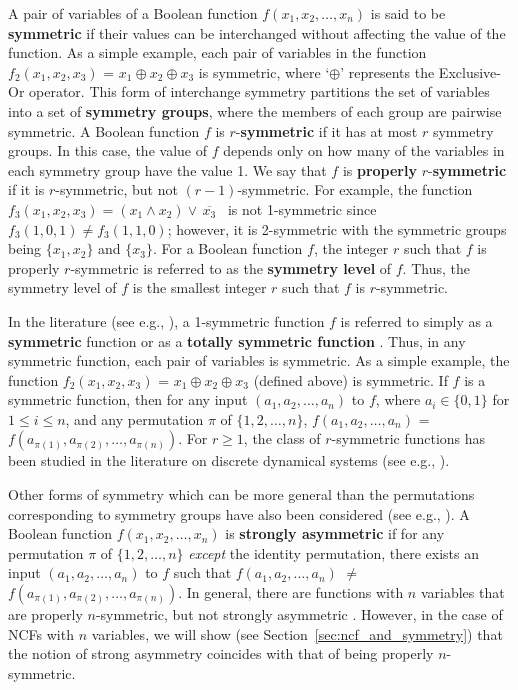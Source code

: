 A pair of variables of a Boolean function $f(x_1, x_2, \ldots, x_n)$ is
said to be \textbf{symmetric} if their values can be interchanged without
affecting the value of the function.
As a simple example, each pair of variables in the function 
$f_2(x_1, x_2, x_3)$ = $x_1 \oplus x_2 \oplus x_3$ is symmetric,
where `$\oplus$' represents the Exclusive-Or operator.
This form of interchange symmetry partitions the set of variables into a set of
\textbf{symmetry groups}, where the members of each group are pairwise symmetric.
A Boolean function $f$ is 
$r$-\textbf{symmetric} if it has at most $r$ symmetry groups.
In this case, the value of $f$
depends only on how many of the variables in each symmetry group have the value 1.
We say that $f$ is \textbf{properly} $r$-\textbf{symmetric} if
it is $r$-symmetric, but not $(r-1)$-symmetric.
For example, the function $f_3(x_1, x_2, x_3) = (x_1 \wedge x_2) \vee\, \overline{x_3}$~
is not 1-symmetric since $f_3(1, 0, 1) \neq f_3(1, 1, 0)$; however, 
it is 2-symmetric with the symmetric groups being $\{x_1, x_2\}$ and $\{x_3\}$.
For a Boolean function $f$, the integer $r$ such that $f$ is properly $r$-symmetric
is referred to as the \textbf{symmetry level} of $f$.
Thus, the symmetry level of $f$ is the smallest integer $r$ such that
$f$ is $r$-symmetric.

In the literature (see e.g., \cite{Crama-Hammer-2011,HT-2016,Toth-etal-1977}),
a 1-symmetric function $f$ is referred to simply
as a \textbf{symmetric} function or 
as a \textbf{totally symmetric function} \cite{Biswas-1970,BS-1968}.
Thus, in any symmetric function, each pair of variables is symmetric.
As a simple example, the function $f_2(x_1, x_2, x_3)$ = 
$x_1 \oplus x_2 \oplus x_3$ (defined above) is symmetric.
If $f$ is a symmetric function, then for any
input $(a_1, a_2, \ldots, a_n)$ to $f$, where $a_i \in \{0,1\}$ for
$1 \leq i \leq n$, and any permutation $\pi$ of $\{1, 2, \ldots, n\}$,
$f(a_1, a_2, \ldots, a_n)$ = $f(a_{\pi(1)}, a_{\pi(2)}, \ldots, a_{\pi(n)})$.
For $r \geq 1$, the class of $r$-symmetric functions has been
studied in the literature on discrete dynamical systems (see e.g., 
\cite{Barrett-etal-2007,Rosenkrantz-etal-2015,MR-2007}).

Other forms of symmetry which can be more general than the permutations 
corresponding to symmetry groups have also been considered (see e.g.,
\cite{Maurer-2015,KS-2000}).
A Boolean function $f(x_1, x_2, \ldots, x_n)$
is \textbf{strongly asymmetric}
if for any permutation $\pi$ of $\{1, 2, \ldots, n\}$
\emph{except} the identity permutation,
there exists an input $(a_1, a_2, \ldots,  a_n)$
to $f$ such that $f(a_1, a_2, \ldots, a_n)$ $\neq$
$f(a_{\pi(1)}, a_{\pi(2)}, \ldots, a_{\pi(n)})$.
In general, there are functions with $n$ variables that are properly
$n$-symmetric, but not strongly asymmetric \cite{KS-2000}.
However, in the case of NCFs with $n$ variables, we will show 
(see Section~\ref{sec:ncf_and_symmetry}) that the notion of 
strong asymmetry coincides with that 
of being properly $n$-symmetric.

